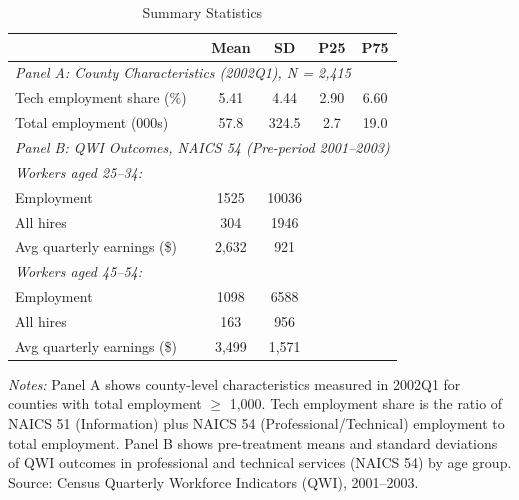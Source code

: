 \begin{table}[htbp]
\centering
\caption{Summary Statistics}
\label{tab:summary}
\begin{tabular}{lcccc}
\toprule
 & Mean & SD & P25 & P75 \\
\midrule
\multicolumn{5}{l}{\textit{Panel A: County Characteristics (2002Q1), N = 2,415}} \\
Tech employment share (\%) & 5.41 & 4.44 & 2.90 & 6.60 \\
Total employment (000s) & 57.8 & 324.5 & 2.7 & 19.0 \\
[0.5em]
\multicolumn{5}{l}{\textit{Panel B: QWI Outcomes, NAICS 54 (Pre-period 2001--2003)}} \\
\multicolumn{5}{l}{\textit{Workers aged 25--34:}} \\
Employment & 1525 & 10036 & & \\
All hires & 304 & 1946 & & \\
Avg quarterly earnings (\$) & 2,632 & 921 & & \\
[0.3em]
\multicolumn{5}{l}{\textit{Workers aged 45--54:}} \\
Employment & 1098 & 6588 & & \\
All hires & 163 & 956 & & \\
Avg quarterly earnings (\$) & 3,499 & 1,571 & & \\
\bottomrule
\end{tabular}
\begin{tablenotes}[flushleft]
\small
\item \textit{Notes:} Panel A shows county-level characteristics measured in 2002Q1 for counties with total employment $\geq$ 1,000. Tech employment share is the ratio of NAICS 51 (Information) plus NAICS 54 (Professional/Technical) employment to total employment. Panel B shows pre-treatment means and standard deviations of QWI outcomes in professional and technical services (NAICS 54) by age group. Source: Census Quarterly Workforce Indicators (QWI), 2001--2003.
\end{tablenotes}
\end{table}

